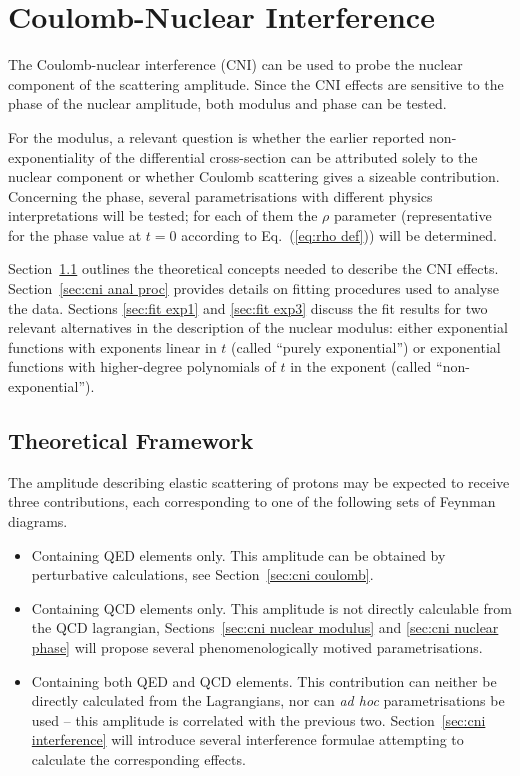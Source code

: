 \section{Coulomb-Nuclear Interference}
\label{sec:coulomb}

The Coulomb-nuclear interference (CNI) can be used to probe the nuclear component of the scattering amplitude. Since the CNI effects are sensitive to the phase of the nuclear amplitude, both modulus and phase can be tested. 

For the modulus, a relevant question is whether the earlier reported non-exponentiality of the differential cross-section \cite{8tev-90m} can be attributed solely to the nuclear component or whether Coulomb scattering gives a sizeable contribution. Concerning the phase, several parametrisations with different physics interpretations will be tested; for each of them the $\rho$ parameter (representative for the phase value at $t = 0$ according to Eq.~(\ref{eq:rho def})) will be determined.

Section~\ref{sec:cni framework} outlines the theoretical concepts needed to describe the CNI effects. Section~\ref{sec:cni anal proc} provides details on fitting procedures used to analyse the data. Sections \ref{sec:fit exp1} and \ref{sec:fit exp3} discuss the fit results for two relevant alternatives in the description of the nuclear modulus: either exponential functions with exponents linear in $t$ (called ``purely exponential'') or exponential functions with higher-degree polynomials of $t$ in the exponent (called ``non-exponential'').



\subsection{Theoretical Framework}
\label{sec:cni framework}

The amplitude describing elastic scattering of protons may be expected to receive three contributions, each corresponding to one of the following sets of Feynman diagrams.
\begin{itemize}
\item Containing QED elements only. This amplitude can be obtained by perturbative calculations, see Section~\ref{sec:cni coulomb}.
\item Containing QCD elements only. This amplitude is not directly calculable from the QCD lagrangian, Sections~\ref{sec:cni nuclear modulus} and \ref{sec:cni nuclear phase} will propose several phenomenologically motived parame\-trisations.
\item Containing both QED and QCD elements. This contribution can neither be directly calculated from the Lagrangians, nor can \textit{ad hoc} parametrisations be used -- this amplitude is correlated with the previous two. Section~\ref{sec:cni interference} will introduce several interference formulae attempting to calculate the corresponding effects.
\end{itemize}

